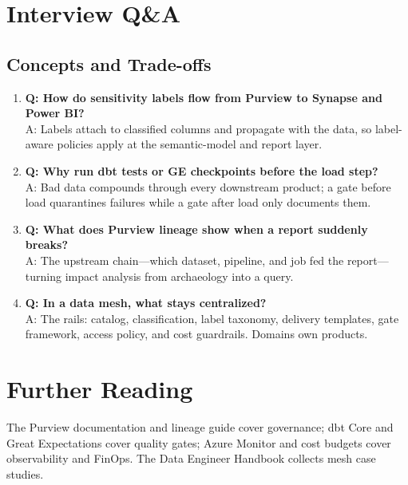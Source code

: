 \section{Interview Q\&A}
\subsection{Concepts and Trade-offs}
\begin{enumerate}
    \item \textbf{Q: How do sensitivity labels flow from Purview to Synapse and Power BI?}\\
    A: Labels attach to classified columns and propagate with the data, so label-aware policies apply at the semantic-model and report layer.
    \item \textbf{Q: Why run dbt tests or GE checkpoints before the load step?}\\
    A: Bad data compounds through every downstream product; a gate before load quarantines failures while a gate after load only documents them.
    \item \textbf{Q: What does Purview lineage show when a report suddenly breaks?}\\
    A: The upstream chain---which dataset, pipeline, and job fed the report---turning impact analysis from archaeology into a query.
    \item \textbf{Q: In a data mesh, what stays centralized?}\\
    A: The rails: catalog, classification, label taxonomy, delivery templates, gate framework, access policy, and cost guardrails. Domains own products.
\end{enumerate}

\section{Further Reading}
The Purview documentation \cite{microsoft2025purview} and lineage guide \cite{microsoft2025purviewLineage} cover governance; dbt Core \cite{dbtlabs2025core} and Great Expectations \cite{greatexpectations2025} cover quality gates; Azure Monitor \cite{microsoft2025azureMonitor} and cost budgets \cite{microsoft2025costBudgets} cover observability and FinOps. The Data Engineer Handbook \cite{dataexpert2025handbook} collects mesh case studies.

